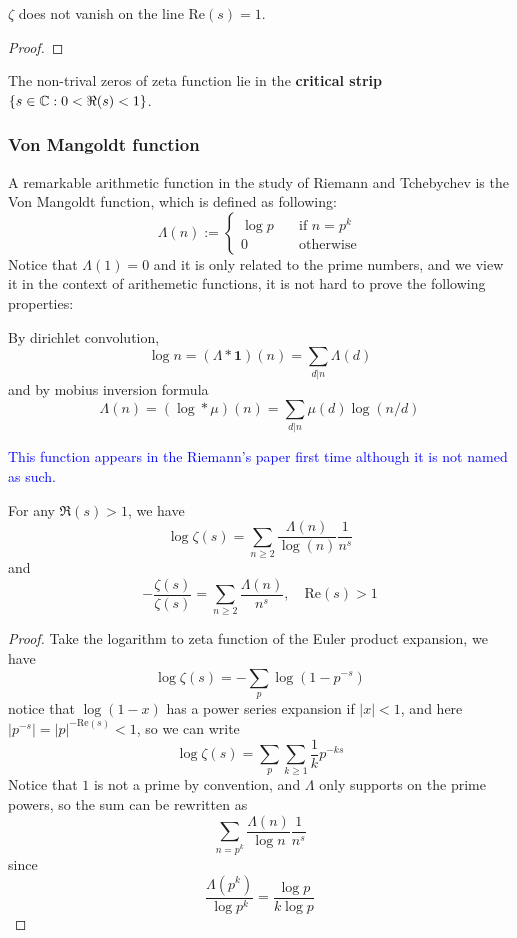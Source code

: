 \begin{colortheorem}[Hamadard,1896]
    \(\zeta\) does not vanish on the line \(\mathrm{Re}(s) = 1\).
\end{colortheorem}

\begin{proof}
    
\end{proof}

\begin{colorcorollary}
    The non-trival zeros of zeta function lie in the \textbf{critical strip} \(\{s \in \mathbb{C}: 0 < \Re(s) < 1\}\).
\end{colorcorollary}

\subsubsection{Von Mangoldt function}

A remarkable arithmetic function in the study of Riemann and Tchebychev is the Von Mangoldt function, which is defined as following:
\[\Lambda(n) := \begin{cases}
    \log p \quad & \text{if } n = p^k \\
    0 \quad & \text{otherwise}
\end{cases}\]
Notice that \(\Lambda(1) = 0\) and it is only related to the prime numbers, and we view it in the context of arithemetic functions, it is not hard to prove the following properties:

\begin{proposition}
    By dirichlet convolution,
    \[\log n = (\Lambda * \mathbf{1})(n) = \sum_{d|n} \Lambda(d)\]
    and by mobius inversion formula
    \[\Lambda(n) = (\log * \mu)(n) = \sum_{d|n} \mu(d) \log(n/d)\]
\end{proposition}


\textcolor{blue}{This function appears in the Riemann's paper first time although it is not named as such.}



\begin{lemma}[Riemann,1859]
    For any \(\Re(s)>1\), we have
    \[\log \zeta(s) = \sum_{n \geq 2} \frac{\Lambda(n)}{\log(n)} \frac{1}{n^s}\]
    and
    \[-\frac{\zeta(s)}{\zeta(s)} = \sum_{n \geq 2}\frac{\Lambda(n)}{n^s} ,\quad \mathrm{Re}(s) > 1\]
\end{lemma}

\begin{proof}
    Take the logarithm to zeta function of the Euler product expansion, we have
    \[\log \zeta(s) = - \sum_{p} \log(1-p^{-s})\]
    notice that \(\log(1-x)\) has a power series expansion if \(|x|<1\), and here \(|p^{-s}| =|p|^{-\mathrm{Re}(s)} <1\), so we can write
    \[\log \zeta(s) = \sum_{p} \sum_{k\geq 1} \frac{1}{k} p^{-ks}\]
    Notice that \(1\) is not a prime by convention, and \(\Lambda\) only supports on the prime powers, so the sum can be rewritten as 
    \[\sum_{n = p^k} \frac{\Lambda(n)}{\log n}\frac{1}{n^s}\]  
    since
    \[\frac{\Lambda(p^k)}{\log p^k}  = \frac{\log p}{k \log p }\]
\end{proof}

